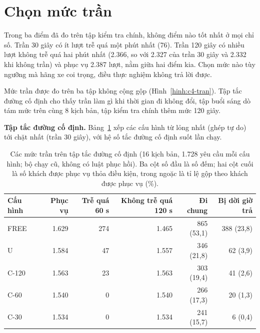 \section{Chọn mức trần}
\label{muc:c4-chontran}

Trong ba điểm đã đo trên tập kiểm tra chính, không điểm nào tốt nhất ở mọi chỉ số. Trần 30 giây có ít lượt trễ quá một
phút nhất (76). Trần 120 giây có nhiều lượt không trễ quá hai phút nhất (2.366, so với 2.327 của trần 30 giây và 2.332
khi không trần) và phục vụ 2.387 lượt, nằm giữa hai điểm kia. Chọn mức nào tùy ngưỡng mà hãng xe coi trọng, điều thực
nghiệm không trả lời được.

Mức trần được đo trên ba tập không cộng gộp (Hình~\ref{hinh:c4-tran}). Tập tắc đường cố định cho thấy trần làm gì khi
thời gian đi không đổi, tập buổi sáng dò tám mức trên cùng 8 kịch bản, tập kiểm tra chính thêm mức 120 giây.

\textbf{Tập tắc đường cố định.} Bảng~\ref{bang:c4-codinh} xếp các cấu hình từ lỏng nhất (ghép tự do) tới chặt nhất
(trần 30 giây), với hệ số tắc đường cố định suốt lần chạy.

\begin{table}[htbp]
\centering
\caption[Các mức trần trên tập tắc đường cố định]{Các mức trần trên tập tắc đường cố định (16 kịch bản, 1.728 yêu cầu mỗi cấu hình; bộ chạy cũ,
không có luật phục hồi). Ba cột số đầu là số đếm; hai cột cuối là số khách được phục vụ thỏa điều kiện, trong ngoặc
là tỉ lệ gộp theo khách được phục vụ (\%).}
\label{bang:c4-codinh}
\small
\begin{tabular}{@{}lrrrrr@{}}
\toprule
\textbf{Cấu hình} & \textbf{Phục vụ} & \textbf{Trễ quá 60 s} & \textbf{Không trễ quá 120 s} &
\textbf{Đi chung} & \textbf{Bị dời giờ trả}\\
\midrule
FREE & 1.629 & 274 & 1.465 & 865 (53,1) & 388 (23,8)\\
U & 1.584 & 47 & 1.557 & 346 (21,8) & 62 (3,9)\\
C-120 & 1.563 & 23 & 1.563 & 303 (19,4) & 41 (2,6)\\
C-60 & 1.540 & 0 & 1.540 & 266 (17,3) & 20 (1,3)\\
C-30 & 1.534 & 0 & 1.534 & 241 (15,7) & 6 (0,4)\\
\bottomrule
\end{tabular}
\end{table}

